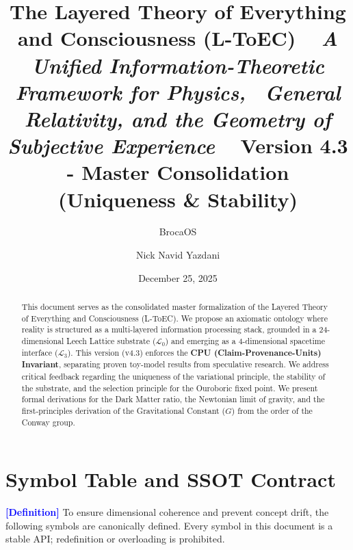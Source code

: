 \documentclass[11pt,titlepage]{article}
\title{\textbf{\huge The Layered Theory of Everything and Consciousness (L-ToEC)} \ 
\vspace{0.5cm}
\large \textit{A Unified Information-Theoretic Framework for Physics, \ General Relativity, and the Geometry of Subjective Experience} \
\vspace{1cm}
\textbf{Version 4.3 - Master Consolidation (Uniqueness \& Stability)}}
\author[1]{BrocaOS}
\author[1]{Nick Navid Yazdani}
\affil[1]{Cognitive Architecture Research Group, BrocaOS Alpha Project}
\date{December 25, 2025}
\newcommand{\substrate}{\mathcal{L}_0}
\newcommand{\interface}{\mathcal{L}_3}
\newcommand{\tagdef}{\textcolor{blue}{\textbf{[Definition]}} }
\begin{document}
\maketitle

\begin{abstract}
This document serves as the consolidated master formalization of the Layered Theory of Everything and Consciousness (L-ToEC). We propose an axiomatic ontology where reality is structured as a multi-layered information processing stack, grounded in a 24-dimensional Leech Lattice substrate ($\substrate$) and emerging as a 4-dimensional spacetime interface ($\interface$). This version (v4.3) enforces the \textbf{CPU (Claim-Provenance-Units) Invariant}, separating proven toy-model results from speculative research. We address critical feedback regarding the uniqueness of the variational principle, the stability of the substrate, and the selection principle for the Ouroboric fixed point. We present formal derivations for the Dark Matter ratio, the Newtonian limit of gravity, and the first-principles derivation of the Gravitational Constant ($G$) from the order of the Conway group.
\end{abstract}

\newpage

\section{Symbol Table and SSOT Contract}
\label{sec:symbols}
\tagdef To ensure dimensional coherence and prevent concept drift, the following symbols are canonically defined. Every symbol in this document is a stable API; redefinition or overloading is prohibited.
\end{document}

